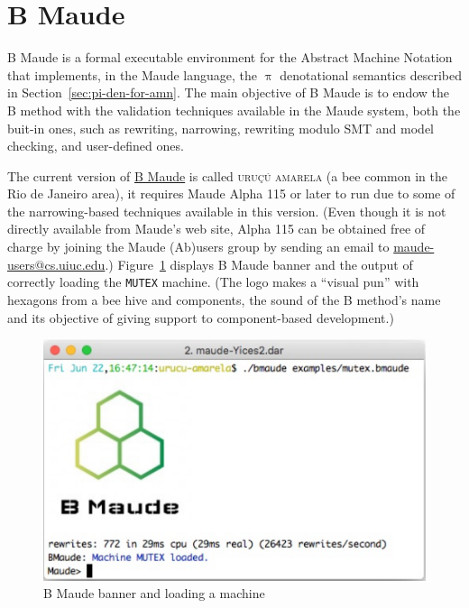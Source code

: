\documentclass[a4paper,openany]{book}
\makeatletter
\def\maxwidth{\ifdim\Gin@nat@width>\linewidth\linewidth
    \else\Gin@nat@width\fi}
\let\Oldincludegraphics\includegraphics
\renewcommand{\includegraphics}[1]{\Oldincludegraphics[width=.8\maxwidth]{#1}}
\makeatother
\begin{document}
\section{B Maude}\label{sec:bmaude}

B Maude is a formal executable environment for the Abstract Machine Notation that implements, in the Maude language, the $\uppi$ denotational semantics described in Section~\ref{sec:pi-den-for-amn}. 
The main objective of B Maude is to endow the B method with the validation techniques available in the Maude system, both the buit-in ones, such as rewriting, narrowing, rewriting modulo SMT and model checking, and user-defined ones.%

The current version of \href{https://github.com/ChristianoBraga/BMaude}{B Maude} is called \textsc{uru\c{c}\'u amarela} (a bee common in the Rio de Janeiro area), it requires Maude Alpha 115 or later to run due to some of the narrowing-based techniques available in this version. (Even though it is not directly available from Maude's web site, Alpha 115 can be obtained free of charge by joining the Maude (Ab)users group by sending an email to {\small\url{maude-users@cs.uiuc.edu}}.) 
%
Figure~\ref{fig:bmaude-splash-screen} displays B Maude banner and the output of correctly loading the \texttt{MUTEX} machine. (The logo makes a ``visual pun'' with hexagons from a bee hive and components, the sound of the B method's name and its objective of giving support to component-based development.) 
\begin{figure}[ht]\centering
\includegraphics{bmaude-splash-screen2}
\caption{B Maude banner and loading a machine}\label{fig:bmaude-splash-screen}
\end{figure}
\end{document}
